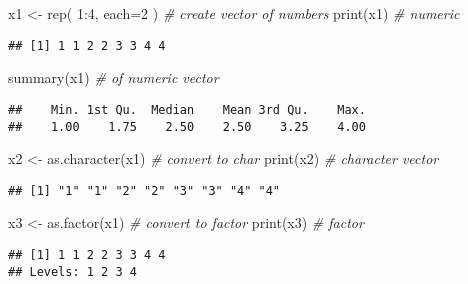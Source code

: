 \documentclass[
]{book}
\newenvironment{Shaded}{\begin{snugshade}}{\end{snugshade}}
\newcommand{\AttributeTok}[1]{\textcolor[rgb]{0.77,0.63,0.00}{#1}}
\newcommand{\CommentTok}[1]{\textcolor[rgb]{0.56,0.35,0.01}{\textit{#1}}}
\newcommand{\DecValTok}[1]{\textcolor[rgb]{0.00,0.00,0.81}{#1}}
\newcommand{\FunctionTok}[1]{\textcolor[rgb]{0.00,0.00,0.00}{#1}}
\newcommand{\NormalTok}[1]{#1}
\newcommand{\OtherTok}[1]{\textcolor[rgb]{0.56,0.35,0.01}{#1}}
\newcommand{\SpecialCharTok}[1]{\textcolor[rgb]{0.00,0.00,0.00}{#1}}
\begin{document}
\begin{Shaded}
\begin{Highlighting}[]
\NormalTok{x1 }\OtherTok{\textless{}{-}} \FunctionTok{rep}\NormalTok{( }\DecValTok{1}\SpecialCharTok{:}\DecValTok{4}\NormalTok{, }\AttributeTok{each=}\DecValTok{2}\NormalTok{ ) }\CommentTok{\# create vector of numbers}
\FunctionTok{print}\NormalTok{(x1) }\CommentTok{\# numeric}
\end{Highlighting}
\end{Shaded}

\begin{verbatim}
## [1] 1 1 2 2 3 3 4 4
\end{verbatim}

\begin{Shaded}
\begin{Highlighting}[]
\FunctionTok{summary}\NormalTok{(x1) }\CommentTok{\# of numeric vector}
\end{Highlighting}
\end{Shaded}

\begin{verbatim}
##    Min. 1st Qu.  Median    Mean 3rd Qu.    Max. 
##    1.00    1.75    2.50    2.50    3.25    4.00
\end{verbatim}

\begin{Shaded}
\begin{Highlighting}[]
\NormalTok{x2 }\OtherTok{\textless{}{-}} \FunctionTok{as.character}\NormalTok{(x1) }\CommentTok{\# convert to char}
\FunctionTok{print}\NormalTok{(x2) }\CommentTok{\# character vector}
\end{Highlighting}
\end{Shaded}

\begin{verbatim}
## [1] "1" "1" "2" "2" "3" "3" "4" "4"
\end{verbatim}

\begin{Shaded}
\begin{Highlighting}[]
\NormalTok{x3 }\OtherTok{\textless{}{-}} \FunctionTok{as.factor}\NormalTok{(x1) }\CommentTok{\# convert to factor}
\FunctionTok{print}\NormalTok{(x3) }\CommentTok{\# factor}
\end{Highlighting}
\end{Shaded}

\begin{verbatim}
## [1] 1 1 2 2 3 3 4 4
## Levels: 1 2 3 4
\end{verbatim}
\end{document}
